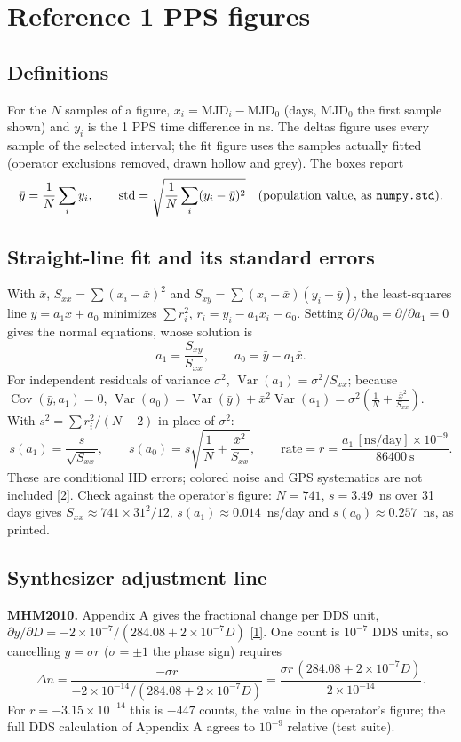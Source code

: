 \documentclass[11pt,a4paper]{article}
\newcommand{\manual}{\href{https://www.gb.nrao.edu/~fghigo/timer/MSMmaser/Maser_UG_75666-201_Rev_J.PDF}{[1]}}
\newcommand{\nist}{\href{https://tf.nist.gov/general/pdf/2220.pdf}{[2]}}
\begin{document}
\section{Reference 1 PPS figures}
\subsection{Definitions}
For the $N$ samples of a figure, $x_i=\mathrm{MJD}_i-\mathrm{MJD}_0$ (days, $\mathrm{MJD}_0$
the first sample shown) and $y_i$ is the 1 PPS time difference in ns. The deltas figure
uses every sample of the selected interval; the fit figure uses the samples actually
fitted (operator exclusions removed, drawn hollow and grey). The boxes report
\[
\bar y=\frac1N\sum_i y_i,\qquad
\mathrm{std}=\sqrt{\frac1N\sum_i (y_i-\bar y)^2}\quad(\text{population value, as \texttt{numpy.std}}).
\]

\subsection{Straight-line fit and its standard errors}
With $\bar x$, $S_{xx}=\sum(x_i-\bar x)^2$ and $S_{xy}=\sum(x_i-\bar x)(y_i-\bar y)$, the
least-squares line $y=a_1x+a_0$ minimizes $\sum r_i^2$, $r_i=y_i-a_1x_i-a_0$. Setting
$\partial/\partial a_0=\partial/\partial a_1=0$ gives the normal equations, whose solution is
\[
a_1=\frac{S_{xy}}{S_{xx}},\qquad a_0=\bar y-a_1\bar x .
\]
For independent residuals of variance $\sigma^2$, $\operatorname{Var}(a_1)=\sigma^2/S_{xx}$;
because $\operatorname{Cov}(\bar y,a_1)=0$,
$\operatorname{Var}(a_0)=\operatorname{Var}(\bar y)+\bar x^2\operatorname{Var}(a_1)
=\sigma^2\left(\frac1N+\frac{\bar x^2}{S_{xx}}\right)$. With
$s^2=\sum r_i^2/(N-2)$ in place of $\sigma^2$:
\[
s(a_1)=\frac{s}{\sqrt{S_{xx}}},\qquad s(a_0)=s\sqrt{\frac1N+\frac{\bar x^2}{S_{xx}}},\qquad
\text{rate}=r=\frac{a_1\,[\mathrm{ns/day}]\times10^{-9}}{86400\ \mathrm{s}} .
\]
These are conditional IID errors; colored noise and GPS systematics are not included \nist.
Check against the operator's figure: $N=741$, $s=3.49$~ns over 31 days gives
$S_{xx}\approx741\times31^2/12$, $s(a_1)\approx0.014$~ns/day and $s(a_0)\approx0.257$~ns, as printed.

\subsection{Synthesizer adjustment line}
\textbf{MHM2010.} Appendix A gives the fractional change per DDS unit,
$\partial y/\partial D=-2\times10^{-7}/(284.08+2\times10^{-7}D)$ \manual. One count is
$10^{-7}$ DDS units, so cancelling $y=\sigma r$ ($\sigma=\pm1$ the phase sign) requires
\[
\Delta n=\frac{-\sigma r}{-2\times10^{-14}/(284.08+2\times10^{-7}D)}
=\frac{\sigma r\,(284.08+2\times10^{-7}D)}{2\times10^{-14}} .
\]
For $r=-3.15\times10^{-14}$ this is $-447$ counts, the value in the operator's figure; the
full DDS calculation of Appendix A agrees to $10^{-9}$ relative (test suite).
\end{document}
